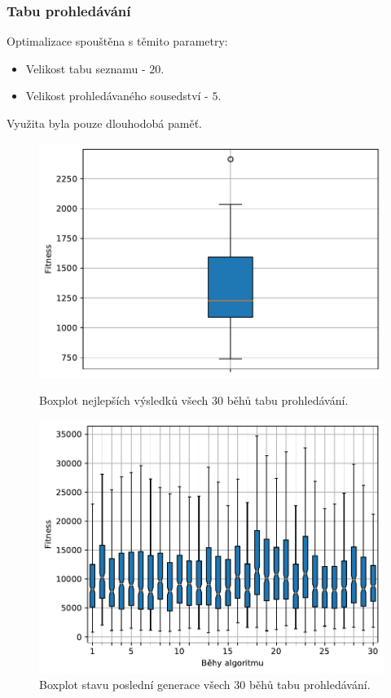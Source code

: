 \subsubsection{Tabu prohledávání}
Optimalizace spouštěna s těmito parametry:
\begin{itemize}
    \item Velikost tabu seznamu - $20$.
    \item Velikost prohledávaného sousedství - $5$.
\end{itemize}
Využita byla pouze dlouhodobá paměť.

\begin{figure}[H]
\begin{minipage}[t]{0.475\linewidth}
\includegraphics[width=\linewidth]{obrazky-figures/statistics/Benchmarks/Rosenbrock/TABU/bestsBoxplot_WithOutliers.pdf}
\caption{Boxplot nejlepších výsledků všech $30$ běhů tabu prohledávání.}
\label{fg:bench:rosenbrock:tabu:best}
\end{minipage}
\hfill
\begin{minipage}[t]{0.475\linewidth}
\includegraphics[width=\linewidth]{obrazky-figures/statistics/Benchmarks/Rosenbrock/TABU/lastGenBoxplots.pdf}
\caption{Boxplot stavu poslední generace všech $30$ běhů tabu prohledávání.}
\label{fg:bench:rosenbrock:tabu:lastGen}
\end{minipage}
\end{figure}

